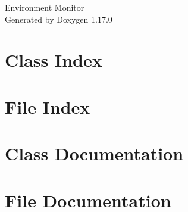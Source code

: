 \documentclass[twoside]{book}
\newcommand{\+}{\discretionary{\mbox{\scriptsize$\hookleftarrow$}}{}{}}
\newcommand{\clearemptydoublepage}{%
    \newpage{\pagestyle{empty}\cleardoublepage}%
  }
\begin{document}
  \raggedbottom
    \hypersetup{pageanchor=false,
                bookmarksnumbered=true,
                pdfencoding=unicode
               }
  \begin{titlepage}
  \vspace*{7cm}
  \begin{center}%
  {\Large Environment Monitor}\\
  \vspace*{1cm}
  {\large Generated by Doxygen 1.17.0}\\
  \end{center}
  \end{titlepage}
  \clearemptydoublepage
  \tableofcontents
  \clearemptydoublepage
  \hypersetup{pageanchor=true}
\chapter{Class Index}

\chapter{File Index}

\chapter{Class Documentation}

\chapter{File Documentation}









  \backmatter
  \newpage
  \clearemptydoublepage
  \printindex
\end{document}
